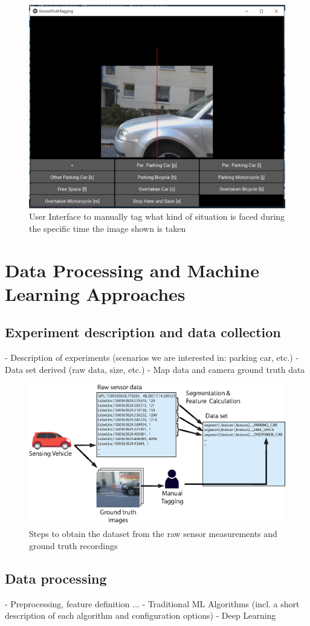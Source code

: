\begin{figure}
	\centering
	\includegraphics[width=\textwidth]{img/ground_truth_tagging_ui.PNG}
	\caption{User Interface to manually tag what kind of situation is faced during the specific time the image shown is taken}
	\label{fig:ground_truth_tagging_ui}
\end{figure}








\chapter{Data Processing and Machine Learning Approaches}

\section{Experiment description and data collection}
\label{sec:experiment_description_data_collection}
- Description of experiments (scenarios we are interested in: parking car, etc.)
- Data set derived (raw data, size, etc.)
- Map data and camera ground truth data

\begin{figure}
	\centering
	\includegraphics[width=\textwidth]{img/obtaining-dataset-architecture.eps}
	\caption{Steps to obtain the dataset from the raw sensor measurements and ground truth recordings}
	\label{fig:dataset_architecture}
\end{figure}

\section{Data processing}
\label{sec:data_processing}
- Preprocessing, feature definition ...
- Traditional ML Algorithms (incl. a short description of each algorithm and configuration options)
- Deep Learning